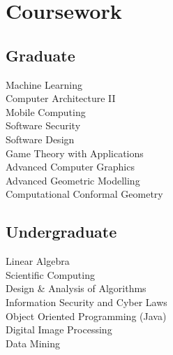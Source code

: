 \documentclass[hidelinks,letterpaper]{deedy-resume-openfont} %
\begin{document}
\begin{minipage}[t]{0.33\textwidth}






\section{Coursework}

\subsection{Graduate}
Machine Learning\\
Computer Architecture II \\
Mobile Computing \\
Software Security \\
Software Design\\
Game Theory with Applications \\
Advanced Computer Graphics\\
Advanced Geometric Modelling \\
Computational Conformal Geometry\\

\sectionsep

\subsection{Undergraduate}
 
Linear Algebra \\ 
Scientific Computing\\
Design \& Analysis of Algorithms \\
Information Security and Cyber Laws\\ 
Object Oriented Programming (Java)\\
Digital Image Processing \\
Data Mining \\



\end{minipage}
\end{document}
